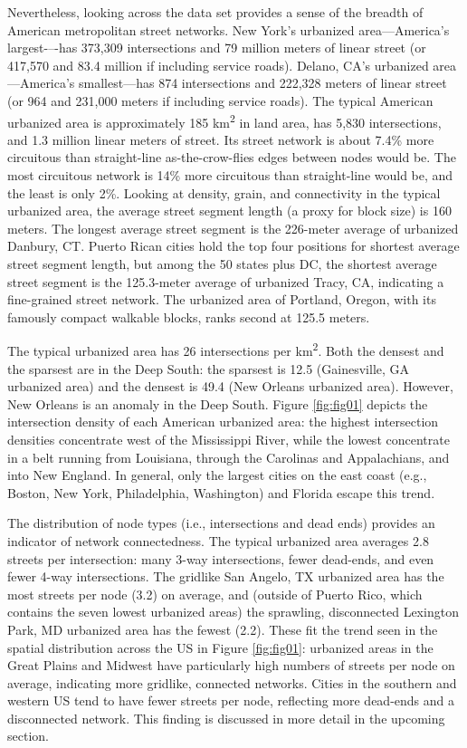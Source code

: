 \documentclass[11pt]{article}
\begin{document}
\begin{multicols}{2}
Nevertheless, looking across the data set provides a sense of the breadth of American metropolitan street networks. New York's urbanized area---America's largest-–-has 373,309 intersections and 79 million meters of linear street (or 417,570 and 83.4 million if including service roads). Delano, CA's urbanized area---America's smallest---has 874 intersections and 222,328 meters of linear street (or 964 and 231,000 meters if including service roads). The typical American urbanized area is approximately 185 km\textsuperscript{2} in land area, has 5,830 intersections, and 1.3 million linear meters of street. Its street network is about 7.4\% more circuitous than straight-line as-the-crow-flies edges between nodes would be. The most circuitous network is 14\% more circuitous than straight-line would be, and the least is only 2\%. Looking at density, grain, and connectivity in the typical urbanized area, the average street segment length (a proxy for block size) is 160 meters. The longest average street segment is the 226-meter average of urbanized Danbury, CT. Puerto Rican cities hold the top four positions for shortest average street segment length, but among the 50 states plus DC, the shortest average street segment is the 125.3-meter average of urbanized Tracy, CA, indicating a fine-grained street network. The urbanized area of Portland, Oregon, with its famously compact walkable blocks, ranks second at 125.5 meters.

The typical urbanized area has 26 intersections per km\textsuperscript{2}. Both the densest and the sparsest are in the Deep South: the sparsest is 12.5 (Gainesville, GA urbanized area) and the densest is 49.4 (New Orleans urbanized area). However, New Orleans is an anomaly in the Deep South. Figure \ref{fig:fig01} depicts the intersection density of each American urbanized area: the highest intersection densities concentrate west of the Mississippi River, while the lowest concentrate in a belt running from Louisiana, through the Carolinas and Appalachians, and into New England. In general, only the largest cities on the east coast (e.g., Boston, New York, Philadelphia, Washington) and Florida escape this trend.

The distribution of node types (i.e., intersections and dead ends) provides an indicator of network connectedness. The typical urbanized area averages 2.8 streets per intersection: many 3-way intersections, fewer dead-ends, and even fewer 4-way intersections. The gridlike San Angelo, TX urbanized area has the most streets per node (3.2) on average, and (outside of Puerto Rico, which contains the seven lowest urbanized areas) the sprawling, disconnected Lexington Park, MD urbanized area has the fewest (2.2). These fit the trend seen in the spatial distribution across the US in Figure \ref{fig:fig01}: urbanized areas in the Great Plains and Midwest have particularly high numbers of streets per node on average, indicating more gridlike, connected networks. Cities in the southern and western US tend to have fewer streets per node, reflecting more dead-ends and a disconnected network. This finding is discussed in more detail in the upcoming section.


\end{multicols}
\end{document}
